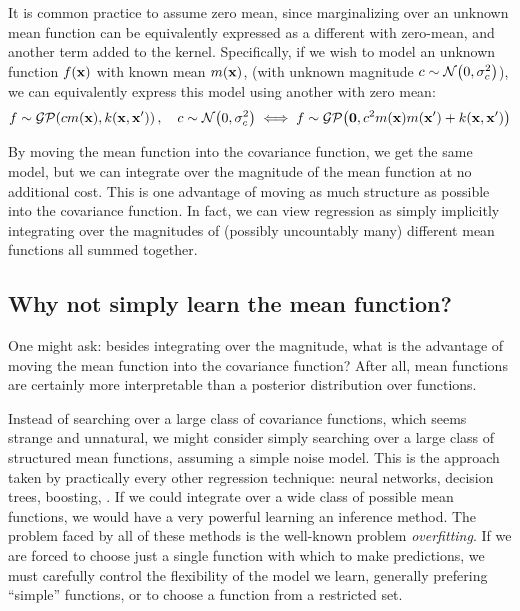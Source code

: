 It is common practice to assume zero mean, since marginalizing over an unknown mean function can be equivalently expressed as a different \gp{} with zero-mean, and another term added to the kernel.
Specifically, if we wish to model an unknown function $f({\bf{x}})$ with known mean $m({\bf{x}})$, (with unknown magnitude $c \sim \mathcal{N}\!\left(0,\sigma^2_c\right)$), we can equivalently express this model using another \gp{} with zero mean:
%
\begin{align}
f \sim \mathcal{GP}\!\left(c m({\bf{x}}),k({\bf{x}},{\bf{x}}')\right), \quad c \sim \mathcal{N}\!\left(0,\sigma^2_c\right)
\iff f \sim \mathcal{GP}\!\left( {\bf{0}} , c^2 m({\bf{x}}) m({\bf{x}}') + k({\bf{x}},{\bf{x}}')\right)
\end{align}

By moving the mean function into the covariance function, we get the same model, but we can integrate over the magnitude of the mean function at no additional cost.
This is one advantage of moving as much structure as possible into the covariance function.
In fact, we can view \gp{} regression as simply implicitly integrating over the magnitudes of (possibly uncountably many) different mean functions all summed together.

\subsection{Why not simply learn the mean function?}
One might ask: besides integrating over the magnitude, what is the advantage of moving the mean function into the covariance function?
After all, mean functions are certainly more interpretable than a posterior distribution over functions.

Instead of searching over a large class of covariance functions, which seems strange and unnatural, we might consider simply searching over a large class of structured mean functions, assuming a simple \iid noise model.
This is the approach taken by practically every other regression technique: neural networks, decision trees, boosting, \etc.
If we could integrate over a wide class of possible mean functions, we would have a very powerful learning an inference method.
The problem faced by all of these methods is the well-known problem \emph{overfitting}.
If we are forced to choose just a single function with which to make predictions, we must carefully control the flexibility of the model we learn, generally prefering ``simple'' functions, or to choose a function from a restricted set.

